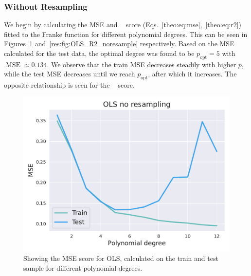 \documentclass[twocolumn,english,notitlepage]{article}
\DeclareMathOperator{\mse}{MSE}
\DeclareMathOperator{\Rsquared}{R^2}
\newcommand{\msub}[2]{\ensuremath{{#1}_\text{#2}}}
\begin{document}
            \subsubsection{Without Resampling}
                We begin by calculating the MSE and $\Rsquared$ score (Eqs.~\ref{theo:eq:mse},~\ref{theo:eq:r2}) fitted to the Franke function for different polynomial degrees. This can be seen in Figures~\ref{res:fig:OLS_mse_noresample} and~\ref{res:fig:OLS_R2_noresample} respectively. Based on the MSE calculated for the test data, the optimal degree was found to be $\msub{p}{opt} = 5$ with $\mse \approx 0.134$. We observe that the train MSE decreases steadily with higher $p$, while the test MSE decreases until we reach $\msub{p}{opt}$, after which it increases. The opposite relationship is seen for the $\Rsquared$ score.   
                \begin{figure}[ht]
                    \centering
                    \includegraphics[width=.9\linewidth]{OLS_mse_noresample.pdf}
                    \caption{Showing the MSE score for OLS, calculated on the train and test sample for different polynomial degrees.}
                    \label{res:fig:OLS_mse_noresample}
                \end{figure}
\end{document}
